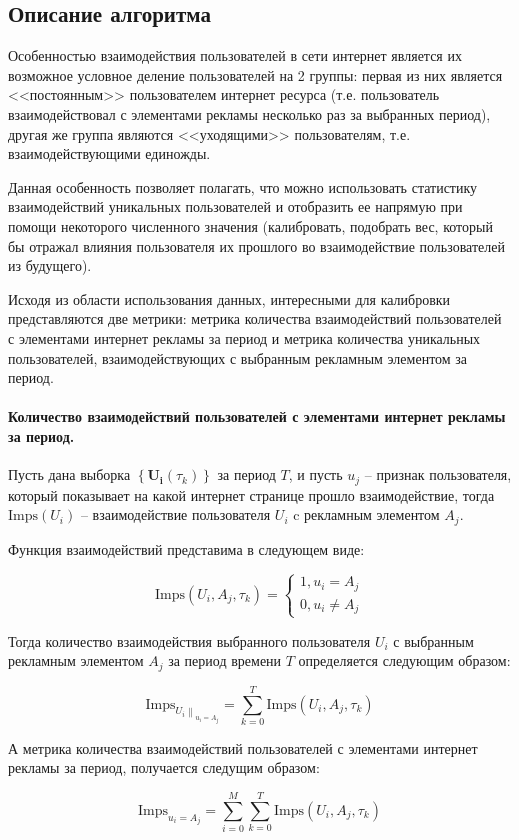 \documentclass[a4paper, 14pt]{extreport}
\begin{document}
    \subsection*{Описание алгоритма}

    Особенностью взаимодействия пользователей в сети интернет является их возможное условное деление пользователей
    на 2 группы: первая из них является <<постоянным>> пользователем интернет ресурса (т.е. пользователь
    взаимодействовал с элементами рекламы несколько раз за выбранных период), другая же группа являются <<уходящими>>
    пользователям, т.е. взаимодействующими единожды.

    Данная особенность позволяет полагать, что можно использовать статистику взаимодействий уникальных пользователей и
    отобразить ее напрямую при помощи некоторого численного значения (калибровать, подобрать вес, который бы отражал
    влияния пользователя их прошлого во взаимодействие пользователей из будущего).

    Исходя из области использования данных, интересными для калибровки представляются две метрики: метрика количества
    взаимодействий пользователей с элементами интернет рекламы за период и метрика количества уникальных пользователей,
    взаимодействующих с выбранным рекламным элементом за период.

    \paragraph{Количество взаимодействий пользователей с элементами интернет рекламы за период.} Пусть дана выборка
    $\left\{ \mathbf{U_i} \left( \tau_k \right) \right\}$ за период $T$, и пусть $u_j$ -- признак пользователя, который
    показывает на какой интернет странице прошло взаимодействие, тогда $\text{Imps}\left( U_i \right)$ -- взаимодействие
    пользователя $U_i$ c рекламным элементом $A_j$.

    Функция взаимодействий представима в следующем виде:

    \begin{equation}
        \text{Imps}\left( U_i, A_j, \tau_k \right) =
        \begin{cases}
            1, u_i = A_j \\
            0, u_i \neq A_j
        \end{cases}
    \end{equation}

    Тогда количество взаимодействия выбранного пользователя $U_i$ с выбранным рекламным элементом $A_j$ за период
    времени $T$ определяется следующим образом:

    \begin{equation}
        \text{Imps}_{\left.U_i\right\|_{u_i = A_j}} = \sum_{k = 0}^T \text{Imps}\left( U_i, A_j, \tau_k \right)
    \end{equation}

    А метрика количества взаимодействий пользователей с элементами интернет рекламы за период,
    получается следущим образом:

    \begin{equation}
        \text{Imps}_{u_i = A_j} = \sum_{i=0}^M \sum_{k = 0}^T \text{Imps}\left( U_i, A_j, \tau_k \right)
    \end{equation}
\end{document}
